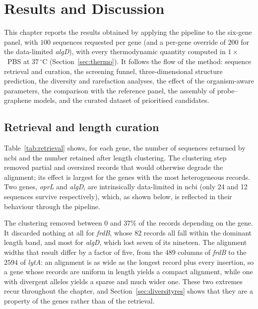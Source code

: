 \chapter{Results and Discussion}

This chapter reports the results obtained by applying the pipeline to the six-gene panel, with
$100$ sequences requested per gene (and a per-gene override of $200$ for the data-limited
\emph{algD}), with every thermodynamic quantity computed in $1\times$~PBS at $37\,^{\circ}$C
(Section~\ref{sec:thermo}). It follows the flow of the method: sequence retrieval and
curation, the screening funnel, three-dimensional structure prediction, the diversity and rarefaction
analyses, the effect of the organism-aware parameters, the comparison with the reference panel,
the assembly of probe--graphene models, and the curated dataset of prioritised candidates.

\section{Retrieval and length curation}

Table~\ref{tab:retrieval} shows, for each gene, the number of sequences returned by
\acrshort{ncbi} and the number retained after length clustering. The clustering step removed
partial and oversized records that would otherwise degrade the alignment; its effect is largest
for the genes with the most heterogeneous records. Two genes, \emph{oprL} and \emph{algD},
are intrinsically data-limited in \acrshort{ncbi} (only 24 and 12 sequences survive
respectively), which, as shown below, is reflected in their behaviour through the pipeline.

The clustering removed between $0$ and $37\%$ of the records depending on the gene. It discarded
nothing at all for \emph{frdB}, whose $82$ records all fall within the dominant length band, and
most for \emph{algD}, which lost seven of its nineteen. The alignment widths that result differ by
a factor of five, from the $489$ columns of \emph{frdB} to the $2594$ of \emph{lytA}: an alignment
is as wide as the longest record plus every insertion, so a gene whose records are uniform in
length yields a compact alignment, while one with divergent alleles yields a sparse and much wider
one. These two extremes recur throughout the chapter, and Section~\ref{sec:diversityres} shows
that they are a property of the genes rather than of the retrieval.

